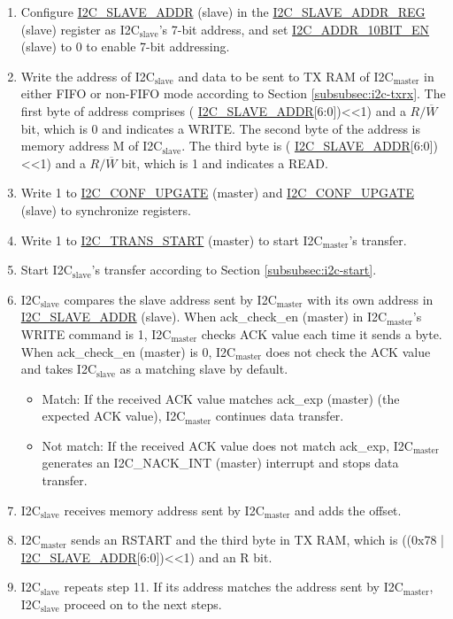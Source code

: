 \documentclass[main\_\_EN.tex]{subfiles}
\begin{document}
\begin{enumerate}
\item Configure \hyperref[fielddesc:I2CSLAVEADDR]{I2C\_SLAVE\_ADDR} (slave) in the \hyperref[regdesc:I2CSLAVEADDRREG]{I2C\_SLAVE\_ADDR\_REG} (slave) register as I2C$_\text{slave}$'s 7-bit address, and set \hyperref[fielddesc:I2CADDR10BITEN]{I2C\_ADDR\_10BIT\_EN} (slave) to 0 to enable 7-bit addressing.
\item Write the address of I2C$_\text{slave}$ and data to be sent to TX RAM of I2C$_\text{master}$ in either FIFO or non-FIFO mode according to Section \ref{subsubsec:i2c-txrx}. The first byte of address comprises ( \hyperref[fielddesc:I2CSLAVEADDR]{I2C\_SLAVE\_ADDR}[6:0])<<1) and a $R/\overline W$ bit, which is 0 and indicates a WRITE. The second byte of the address is memory address M of I2C$_\text{slave}$. The third byte is ( \hyperref[fielddesc:I2CSLAVEADDR]{I2C\_SLAVE\_ADDR}[6:0])<<1) and a $R/\overline W$ bit, which is 1 and indicates a READ.

\item Write 1 to \hyperref[fielddesc:I2CCONFUPGATE]{I2C\_CONF\_UPGATE} (master) and \hyperref[fielddesc:I2CCONFUPGATE]{I2C\_CONF\_UPGATE} (slave) to synchronize registers.
\item Write 1 to \hyperref[fielddesc:I2CTRANSSTART]{I2C\_TRANS\_START} (master) to start I2C$_\text{master}$'s transfer.
\item Start I2C$_\text{slave}$'s transfer according to Section \ref{subsubsec:i2c-start}.
\item I2C$_\text{slave}$ compares the slave address sent by I2C$_\text{master}$ with its own address in \hyperref[fielddesc:I2CSLAVEADDR]{I2C\_SLAVE\_ADDR} (slave). When ack\_check\_en (master) in I2C$_\text{master}$'s WRITE command is 1, I2C$_\text{master}$ checks ACK value each time it sends a byte. When ack\_check\_en (master) is 0, I2C$_\text{master}$ does not check the ACK value and takes I2C$_\text{slave}$ as a matching slave by default.
\begin{itemize}
\item Match: If the received ACK value matches ack\_exp (master) (the expected ACK value), I2C$_\text{master}$ continues data transfer.
\item Not match: If the received ACK value does not match ack\_exp, I2C$_\text{master}$ generates an I2C\_NACK\_INT (master) interrupt and stops data transfer.
\end{itemize}
\item I2C$_\text{slave}$ receives memory address sent by I2C$_\text{master}$ and adds the offset.
\item I2C$_\text{master}$ sends an RSTART and the third byte in TX RAM, which is ((0x78 | \hyperref[fielddesc:I2CSLAVEADDR]{I2C\_SLAVE\_ADDR}[6:0])<<1) and an R bit.
\item I2C$_\text{slave}$ repeats step 11. If its address matches the address sent by I2C$_\text{master}$, I2C$_\text{slave}$ proceed on to the next steps.


\end{enumerate}
\end{document}
